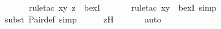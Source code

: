 \begin{isabellebody}
\ \ \ \ \ \isamarkupfalse%
{\isacharparenleft}{\kern0pt}rule{\isacharunderscore}{\kern0pt}tac\ x{\isacharequal}{\kern0pt}{\isachardoublequoteopen}{\isacharless}{\kern0pt}y{\isacharcomma}{\kern0pt}\ z{\isachargreater}{\kern0pt}{\isachardoublequoteclose}\ \ bexI{\isacharparenright}{\kern0pt}\isanewline
\ \ \ \ \ \ \isamarkupfalse%
{\isacharparenleft}{\kern0pt}rule{\isacharunderscore}{\kern0pt}tac\ x{\isacharequal}{\kern0pt}{\isachardoublequoteopen}{\isacharbraceleft}{\kern0pt}y{\isacharbraceright}{\kern0pt}{\isachardoublequoteclose}\ \ bexI{\isacharcomma}{\kern0pt}\ simp{\isacharparenright}{\kern0pt}\isanewline
\ \ \ \ \ \ \isamarkupfalse%
{\isacharparenleft}{\kern0pt}subst\ Pair{\isacharunderscore}{\kern0pt}def{\isacharcomma}{\kern0pt}\ simp{\isacharparenright}{\kern0pt}\isanewline
\ \ \ \ \isamarkupfalse%
\ zH\ \isanewline
\ \ \ \ \isamarkupfalse%
\ auto\isanewline
{}\isamarkupfalse%
%
\endisatagproof
{\isafoldproof}%
%
\isadelimproof
\isanewline
%
\endisadelimproof
\isanewline
{}\isamarkupfalse%
\isanewline
%
\isadelimtheory
%
\endisadelimtheory
%
\isatagtheory
{}\isamarkupfalse%
%
\endisatagtheory
{\isafoldtheory}%
%
\isadelimtheory
%
\endisadelimtheory
%
\end{isabellebody}%
\endinput
